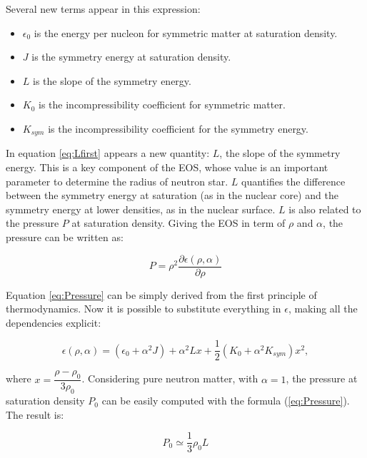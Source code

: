 Several new terms appear in this expression:
\begin{itemize}
\item $\epsilon_{0}$ is the energy per nucleon for symmetric matter at saturation density.
\item $J$ is the symmetry energy at saturation density.
\item $L$ is the slope of the symmetry energy.
\item $K_{0}$ is the incompressibility coefficient for symmetric matter. 
\item $K_{sym}$ is the incompressibility coefficient for the symmetry energy.
\end{itemize}

In equation \ref{eq:Lfirst} appears a new quantity: $L$, the slope of the symmetry energy. This is a key component of the EOS, whose value is an important parameter to determine the radius of neutron star. $L$ quantifies the difference between the symmetry energy at saturation (as in the nuclear core) and the symmetry energy at lower densities, as in the nuclear surface. $L$ is also related to the pressure $P$ at saturation density. Giving the EOS in term of $\rho$ and $\alpha$, the pressure can be written as:

\begin{equation} \label{eq:Pressure}
P = \rho^{2} \dfrac{\partial \epsilon(\rho, \alpha)}{\partial \rho}
\end{equation} 

Equation \ref{eq:Pressure} can be simply derived from the first principle of thermodynamics. Now it is possible to substitute everything in $\epsilon$, making all the dependencies explicit:

\begin{equation}
\epsilon (\rho, \alpha) = (\epsilon_{0} + \alpha^{2} J) + \alpha^{2}Lx + \frac{1}{2} (K_{0} + \alpha^{2}K_{sym})x^{2} ,
\end{equation}

where $x = \dfrac{\rho - \rho_{0}}{3 \rho_{0}}$. Considering pure neutron matter, with $\alpha = 1$, the pressure at saturation density $P_{0}$ can be easily computed with the formula (\ref{eq:Pressure}). The result is:

\begin{equation} \label{eq:PressureL}
P_{0} \simeq \dfrac{1}{3}\rho_{0} L
\end{equation}

